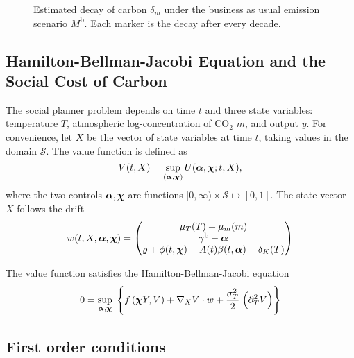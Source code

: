 \documentclass[../../main.tex]{subfiles}
\begin{document}
\begin{figure}[H]
    \centering
    \caption{Estimated decay of carbon $\delta_m$ under the business as usual emission scenario $M^{\mathrm{b}}$. Each marker is the decay after every decade.}
    \label{fig:decaypath}
\end{figure}


\subsection{Hamilton-Bellman-Jacobi Equation and the Social Cost of Carbon}

The social planner problem depends on time $t$ and three state variables: temperature $T$, atmospheric log-concentration of CO$_2$ $m$, and output $y$. For convenience, let $X$ be the vector of state variables at time $t$, taking values in the domain $\mathcal{S}$. The value function is defined as \begin{equation}
    V(t, X) = \sup_{(\bm{\alpha}, \bm{\chi})} U(\bm{\alpha}, \bm{\chi}; t, X),
\end{equation} where the two controls $\bm{\alpha}, \bm{\chi}$ are functions $[0, \infty) \times \mathcal{S} \mapsto [0, 1]$. The state vector $X$ follows the drift \begin{equation}
    w(t, X, \bm{\alpha}, \bm{\chi}) = \begin{pmatrix}
        \mu_T(T) + \mu_m(m) \\
        \gamma^{\mathrm{b}} - \bm{\alpha} \\
        \varrho + \phi(t, \bm{\chi}) - A(t) \beta(t, \bm{\alpha}) - \delta_K(T)
    \end{pmatrix}
\end{equation}

\begin{proposition}
    The value function satisfies the Hamilton-Bellman-Jacobi equation \begin{equation}
        0 = \sup_{\bm{\alpha}, \bm{\chi}} \; \Bigg\{ f\left(\bm{\chi} Y, V\right) + \nabla_X V \cdot w + \frac{\sigma_T^2}{2} \; \Big(\partial^2_T V \Big) \Bigg\}
    \end{equation}
\end{proposition}

\subsection{First order conditions}
\end{document}
